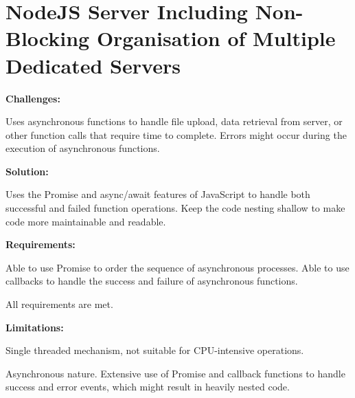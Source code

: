 \documentclass[11pt, a4paper]{article}
\begin{document}
\section{NodeJS Server Including Non-Blocking Organisation of Multiple Dedicated Servers}
\textbf{Challenges:}
\begin{enumerate*}[label=\textbf{\arabic*})]
\item Uses asynchronous functions to handle file upload, data retrieval from server, or other
function calls that require time to complete. Errors might occur during the execution of
asynchronous functions.
\end{enumerate*}
%
\textbf{Solution:}
\begin{enumerate*}[label=\textbf{\arabic*})]
\item Uses the Promise and async/await features of JavaScript to handle both successful and failed
function operations. Keep the code nesting shallow to make code more maintainable and readable.
\end{enumerate*}
%
\textbf{Requirements:}
\begin{enumerate*}[label=\textbf{\arabic*})]
\item Able to use Promise to order the sequence of asynchronous processes. Able to use callbacks to
handle the success and failure of asynchronous functions.
\item All requirements are met.
\end{enumerate*}
%
\textbf{Limitations:}
\begin{enumerate*}[label=\textbf{\arabic*})]
\item Single threaded mechanism, not suitable for CPU-intensive operations.
\item Asynchronous nature. Extensive use of Promise and callback functions to handle success and
error events, which might result in heavily nested code.
\end{enumerate*}
\end{document}
